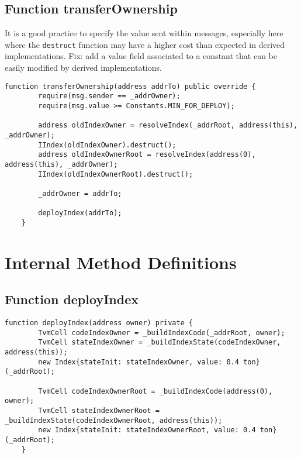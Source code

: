 \subsection{Function transferOwnership}


 { It is
  a good practice to specify the value sent within messages,
  especially here where the {\tt destruct} function may have a higher
  cost than expected in derived implementations. Fix: add a value
  field associated to a constant that can be easily modified by
  derived implementations.  }


\begin{lstlisting}[firstnumber=35]
    function transferOwnership(address addrTo) public override {
        require(msg.sender == _addrOwner);
        require(msg.value >= Constants.MIN_FOR_DEPLOY);

        address oldIndexOwner = resolveIndex(_addrRoot, address(this), _addrOwner);
        IIndex(oldIndexOwner).destruct();
        address oldIndexOwnerRoot = resolveIndex(address(0), address(this), _addrOwner);
        IIndex(oldIndexOwnerRoot).destruct();

        _addrOwner = addrTo;

        deployIndex(addrTo);
    }
\end{lstlisting}

\section{Internal Method Definitions}


\subsection{Function deployIndex}


\begin{lstlisting}[firstnumber=49]
    function deployIndex(address owner) private {
        TvmCell codeIndexOwner = _buildIndexCode(_addrRoot, owner);
        TvmCell stateIndexOwner = _buildIndexState(codeIndexOwner, address(this));
        new Index{stateInit: stateIndexOwner, value: 0.4 ton}(_addrRoot);

        TvmCell codeIndexOwnerRoot = _buildIndexCode(address(0), owner);
        TvmCell stateIndexOwnerRoot = _buildIndexState(codeIndexOwnerRoot, address(this));
        new Index{stateInit: stateIndexOwnerRoot, value: 0.4 ton}(_addrRoot);
    }
\end{lstlisting}
